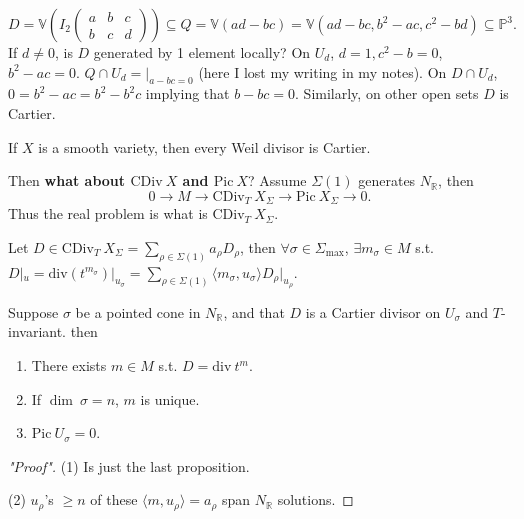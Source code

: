 \documentclass[a4paper,12pt]{amsart}
\newcommand{\RR}{\mathbb{R}}
\begin{document}
\begin{example}
	\begin{displaymath}
	D=\mathbb{V}\left(I_2\begin{pmatrix}a&b&c\\ b&c&d\end{pmatrix}\right)\subseteq Q=\mathbb{V}(ad-bc)=\mathbb{V}(ad-bc,b^2-ac,c^2-bd)\subseteq\mathbb{P}^3.
	\end{displaymath}
	If $d\neq0$, is $D$ generated by 1 element locally? On $U_d$, $d=1,c^2-b=0$, $b^2-ac=0$. $Q\cap U_d=|_{a-bc=0}$ (here I lost my writing in my notes). On $D\cap U_d$, $0=b^2-ac=b^2-b^2c$ implying that $b-bc=0$. Similarly, on other open sets $D$ is Cartier.
\end{example}

\begin{theorem}
	If $X$ is a smooth variety, then every Weil divisor is Cartier.
\end{theorem}

Then \textbf{what about $\mathrm{CDiv}~X$ and $\mathrm{Pic}~X$}? Assume $\Sigma(1)$ generates $N_\RR$, then
\begin{displaymath}
0\to M\to \mathrm{CDiv}_T~X_\Sigma\to\mathrm{Pic}~X_\Sigma\to0.
\end{displaymath}
Thus the real problem is what is $\mathrm{CDiv}_T~X_\Sigma$.

\begin{proposition}
	Let $D\in\mathrm{CDiv}_T~X_\Sigma=\sum_{\rho\in\Sigma(1)}a_\rho D_\rho$, then $\forall\sigma\in\Sigma_{\mathrm{max}}$, $\exists m_\sigma\in M$ s.t. $D|_{u}=\mathrm{div}(t^{m_\sigma})|_{u_\sigma}=\sum_{\rho\in\Sigma(1)}\langle m_\sigma,u_\sigma\rangle D_\rho|_{u_\rho}$.
\end{proposition}

\begin{proposition}
	Suppose $\sigma$ be a pointed cone in $N_\RR$, and that $D$ is a Cartier divisor on $U_\sigma$ and $T$-invariant. then
	\begin{enumerate}
		\item There exists $m\in M$ s.t. $D=\mathrm{div}~t^m$.
		\item If $\dim~\sigma=n$, $m$ is unique.
		\item $\mathrm{Pic}~U_\sigma=0$.
	\end{enumerate}
\end{proposition}
\begin{proof}["Proof"]
	(1) Is just the last proposition.\par
	(2) $u_\rho$'s $\geq n$ of these $\langle m,u_\rho\rangle=a_\rho$ span $N_\RR$ solutions.
\end{proof}
\end{document}
